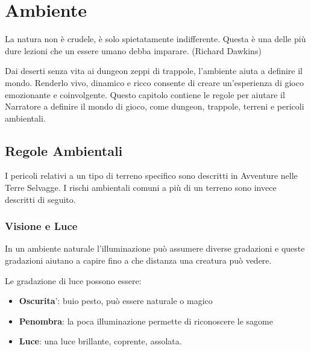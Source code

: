 \documentclass[a4paper,11pt,twoside,openany]{book}
\begin{document}
\pagebreak

\section{Ambiente}

\label{ambiente}
\begin{tcolorbox}[enhanced,arc=5pt,boxrule=0.3pt]{La natura non è crudele, è solo spietatamente indifferente. Questa è una delle più dure lezioni che un essere umano debba imparare. (Richard Dawkins)}\end{tcolorbox}\medskip

Dai deserti senza vita ai dungeon zeppi di trappole, l'ambiente aiuta a definire il mondo. Renderlo vivo, dinamico e ricco consente di creare un'esperienza di gioco emozionante e coinvolgente. Questo capitolo contiene le regole per aiutare il Narratore a definire il mondo di gioco, come dungeon, trappole, terreni e pericoli ambientali.

\subsection{Regole Ambientali}

\label{regole-ambientali}

I pericoli relativi a un tipo di terreno specifico sono descritti in Avventure nelle Terre Selvagge. I rischi ambientali comuni a più di un terreno sono invece descritti di seguito.

\subsubsection{Visione e Luce}

\label{visione-e-luce}

In un ambiente naturale l'illuminazione può assumere diverse gradazioni e queste gradazioni aiutano a capire fino a che distanza una creatura può vedere.

Le gradazione di luce possono essere:
\begin{itemize}
	\item
	      \textbf{Oscurita}': buio pesto, può essere naturale o magico
	\item
	      \textbf{Penombra}: la poca illuminazione permette di riconoscere le sagome
	\item
	      \textbf{Luce}: una luce brillante, coprente, assolata.
\end{itemize}
\end{document}
